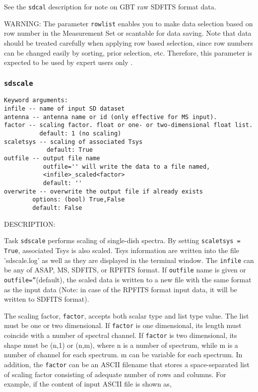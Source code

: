 See the {\tt sdcal} description for note on GBT raw SDFITS format data.

WARNING:  The parameter {\tt rowlist} enables you to make data selection based
on row number in the Measurement Set or scantable for data saving. 
Note that data should be treated carefully when applying row
based selection, since row numbers can be changed easily by
sorting, prior selection, etc. Therefore, this parameter is expected
to be used by expert users only . 


\subsubsection{{\tt sdscale}}
\label{section:sd.sdtasks.tasks.sdscale}

\begin{verbatim}
Keyword arguments:
infile -- name of input SD dataset
antenna -- antenna name or id (only effective for MS input). 
factor -- scaling factor. float or one- or two-dimensional float list.
          default: 1 (no scaling)
scaletsys -- scaling of associated Tsys
            default: True
outfile -- output file name 
           outfile='' will write the data to a file named,
           <infile>_scaled<factor>
           default: ''
overwrite -- overwrite the output file if already exists
        options: (bool) True,False
        default: False
\end{verbatim}

DESCRIPTION:

Task {\tt sdscale} performs scaling of single-dish spectra.
By setting {\tt scaletsys = True}, associated Tsys is also scaled.
Tsys information are written into the file 'sdscale.log'
as well as they are displayed in the terminal window.
The {\tt infile} can be any of ASAP, MS, SDFITS, or RPFITS format.
If {\tt outfile} name is given or {\tt outfile=''}(default), the scaled data is written
to a new file with the same format as the input data (Note: in case of the
RPFITS format input data, it will be written to SDFITS format).
    
The scaling factor, {\tt factor}, accepts both scalar type and list type
value. The list must be one or two dimensional. If {\tt factor} is one
dimensional, its length must coincide with a number of spectral
channel. If {\tt factor} is two dimensional, its shape must be (n,1) or
(n,m), where n is a number of spectrum, while m is a number of channel
for each spectrum. m can be variable for each spectrum. In addition,
the {\tt factor} can be an ASCII filename that stores a space-separated list
of scaling factor consisting of adequate number of rows and columns.
For example, if the content of input ASCII file is shown as,

